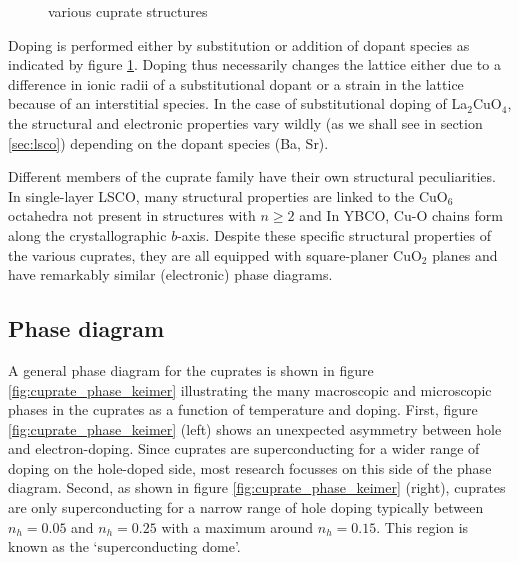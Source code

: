 \begin{figure}
    \centering
    \caption[various cuprate structures]{various cuprate structures}
    \label{fig:cuprate_family_structures}
\end{figure}

Doping is performed either by substitution or addition of dopant species as indicated by figure \ref{fig:cuprate_family_structures}. Doping thus necessarily changes the lattice either due to a difference in ionic radii of a substitutional dopant or a strain in the lattice because of an interstitial species. In the case of substitutional doping of La$_2$CuO$_4$, the structural and electronic properties vary wildly (as we shall see in section \ref{sec:lsco}) depending on the dopant species (Ba, Sr).

Different members of the cuprate family have their own structural peculiarities. In single-layer LSCO, many structural properties are linked to the CuO$_6$ octahedra not present in structures with $n \geq 2$ and In YBCO, Cu-O chains form along the crystallographic $b$-axis. Despite these specific structural properties of the various cuprates, they are all equipped with square-planer CuO$_2$ planes and have remarkably similar (electronic) phase diagrams.

\subsection{Phase diagram}
A general phase diagram for the cuprates is shown in figure \ref{fig:cuprate_phase_keimer} illustrating the many macroscopic and microscopic phases in the cuprates as a function of temperature and doping. First, figure \ref{fig:cuprate_phase_keimer} (left) shows an unexpected asymmetry between hole and electron-doping. Since cuprates are superconducting for a wider range of doping on the hole-doped side, most research focusses on this side of the phase diagram. Second, as shown in figure \ref{fig:cuprate_phase_keimer} (right), cuprates are only superconducting for a narrow range of hole doping typically between $n_h = 0.05$ and $n_h = 0.25$ with a maximum around $n_h = 0.15$. This region is known as the `superconducting dome'. 


